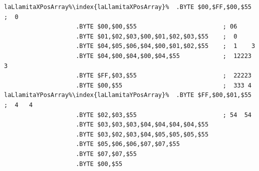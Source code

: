 \begin{lstlisting}[caption=The paint order of pixels for 'La Llamita' in Psychedelia.,escapechar=\%]
laLlamitaXPosArray%\index{laLlamitaXPosArray}%  .BYTE $00,$FF,$00,$55                    ;  0       
                    .BYTE $00,$00,$55                        ; 06      
                    .BYTE $01,$02,$03,$00,$01,$02,$03,$55    ;  0      
                    .BYTE $04,$05,$06,$04,$00,$01,$02,$55    ;  1    3 
                    .BYTE $04,$00,$04,$00,$04,$55            ;  12223 3
                    .BYTE $FF,$03,$55                        ;  22223  
                    .BYTE $00,$55                            ;  333 4  
laLlamitaYPosArray%\index{laLlamitaYPosArray}%  .BYTE $FF,$00,$01,$55                    ;  4   4  
                    .BYTE $02,$03,$55                        ; 54  54  
                    .BYTE $03,$03,$03,$04,$04,$04,$04,$55
                    .BYTE $03,$02,$03,$04,$05,$05,$05,$55
                    .BYTE $05,$06,$06,$07,$07,$55
                    .BYTE $07,$07,$55
                    .BYTE $00,$55
\end{lstlisting}
\clearpage

